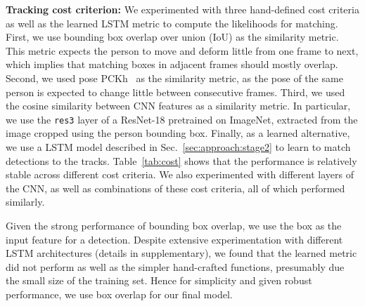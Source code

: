 \documentclass[10pt,twocolumn,letterpaper]{article}
\begin{document}
{\noindent \bf Tracking cost criterion:}\label{sec:exp:cost}
We experimented with three hand-defined cost criteria as well as the learned LSTM metric to
compute the likelihoods for matching.
First, we use bounding box overlap over union (IoU) as the similarity metric.
This metric expects the person to move and deform little from one frame to next, which implies that matching boxes in adjacent frames should mostly overlap. Second, we used pose PCKh~\cite{yang2013articulated} as
the similarity metric, as the pose of the same person is expected to change little between
consecutive frames. 
Third, we used the cosine similarity between CNN features as a similarity metric. In particular, we use the \texttt{res3} layer of a ResNet-18 pretrained on ImageNet, extracted from the
image cropped using the person bounding box. 
Finally, as a learned alternative, we use a LSTM model described in Sec.~\ref{sec:approach:stage2} to learn to match detections to the tracks. Table~\ref{tab:cost} shows that the performance is relatively stable across different
cost criteria. We also experimented with different layers of the CNN, as well as combinations of these cost criteria, all of which performed similarly. 

Given the strong performance of bounding box overlap,
we use the box  as the input feature for a detection.
Despite extensive experimentation with different LSTM architectures (details in supplementary), we found that the learned metric did not perform as well as the simpler hand-crafted functions,
presumably due the small size of the training set. 
Hence for simplicity and given robust performance, we
use box overlap for our final model.
\end{document}
